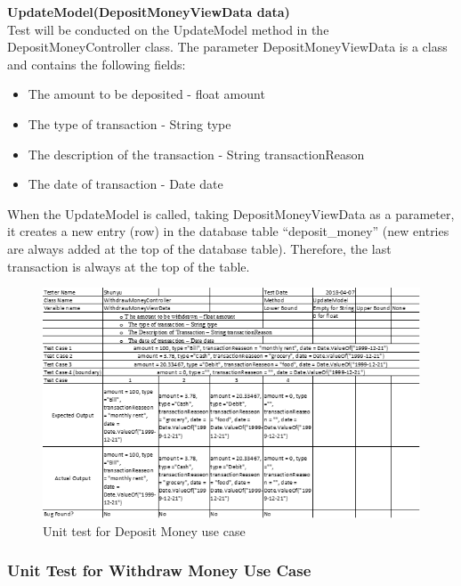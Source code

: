 \documentclass[12pt]{article}
\begin{document}
{\bf UpdateModel(DepositMoneyViewData data)}\\
Test will be conducted on the UpdateModel method in the DepositMoneyController class. The parameter DepositMoneyViewData is a class and contains the following fields:
\begin{itemize}
  \item The amount to be deposited - float amount
  \item The type of transaction - String type
  \item The description of the transaction - String transactionReason
  \item The date of transaction - Date date
\end{itemize}
When the UpdateModel is called, taking DepositMoneyViewData as a parameter, it creates a new entry (row) in the database table “deposit\_money” (new entries are always added at the top of the database table). Therefore, the last transaction is always at the top of the table.

\begin{figure}[h!]
  \centering
  \includegraphics[]{unit_test_deposit.png}
  \caption{Unit test for Deposit Money use case}
\end{figure}

\subsubsection{Unit Test for Withdraw Money Use Case}
\end{document}
